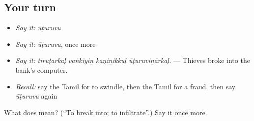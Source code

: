 \subsection*{Your turn}
\begin{itemize}
\raggedright
  \item \emph{Say it:} \emph{ūṭuruvu}
  \item \emph{Say it:} \emph{ūṭuruvu}, once more
  \item \emph{Say it:} \emph{tiruṭarkaḷ vaṅkiyiṉ kaṇiṉikkuḷ ūṭuruviṉārkaḷ.} — Thieves broke into the bank's computer.
  \item \emph{Recall:} say the Tamil for to swindle, then the Tamil for a fraud, then say \emph{ūṭuruvu} again
\end{itemize}

\begin{tcolorbox}[breakable,colback=teal!4,colframe=teal!35!black,title={Before you move on}]
What does  mean? (\textquotedblleft{}To break into; to infiltrate\textquotedblright{}.) Say it once more.
\end{tcolorbox}
